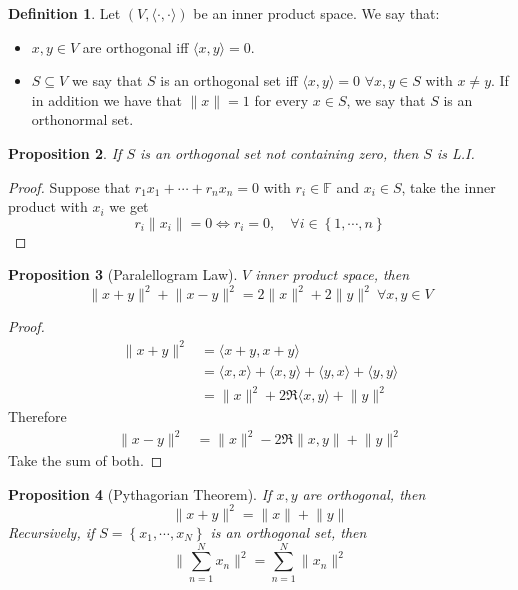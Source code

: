 \documentclass[11pt,a4paper]{article}
\theoremstyle{definition}
\newtheorem{definition}{Definition}[section]
\theoremstyle{plain}
\newtheorem{proposition}[definition]{Proposition}
\theoremstyle{remark}
\newcommand{\F}{\mathbb{F}}
\renewcommand{\set}[1]{\left\{ #1 \right\}}
\newcommand{\angles}[1]{\langle #1 \rangle}
\newcommand{\norm}[1]{\lVert #1 \rVert}
\newcommand{\1}{\mathbbm{1}}
\begin{document}
\begin{definition}
    Let $(V, \angles{\cdot, \cdot})$ be an inner product space. We say that: 
    \begin{itemize}
        \item $x, y \in V$ are orthogonal iff $\angles{x, y} = 0$.
        \item $S \subseteq V$ we say that $S$ is an orthogonal set iff $\angles{x, y} = 0$ $\forall x, y \in S$ with $x \ne y$. If in addition we have that 
        $\norm{x} = 1$ for every $x \in S$, we say that $S$ is an orthonormal set. 
    \end{itemize}
\end{definition}

\begin{proposition}
    If $S$ is an orthogonal set not containing zero, then $S$ is L.I. 
\end{proposition}

\begin{proof}
    Suppose that $r_1 x_1 + \cdots + r_n x_n = 0$ with $r_i \in \F$ and $x_i \in S$, take the inner product with $x_i$ we get 
    $$r_i \norm{x_i} = 0 \iff r_i = 0, \quad \forall i \in \set{1, \cdots, n}$$
\end{proof}

\begin{proposition}[Paralellogram Law]
    $V$ inner product space, then 
    $$\norm{x + y}^2 + \norm{x-y}^2 = 2 \norm{x}^2 + 2 \norm{y}^2 \ \forall x,y \in V$$
\end{proposition}

\begin{proof}
    \begin{align*}
        \norm{x+y}^2 &= \angles{x+y, x+y} \\
        &= \angles{x,x} + \angles{x, y} + \angles{y,x} + \angles{y,y} \\
        &= \norm{x}^2 + 2 \Re \angles{x,y} + \norm{y}^2 
    \end{align*}
    Therefore 
    \begin{align*}
        \norm{x-y}^2 &= \norm{x}^2 - 2 \Re \norm{x,y} + \norm{y}^2
    \end{align*}
    Take the sum of both.
\end{proof}

\begin{proposition}[Pythagorian Theorem]
    If $x, y$ are orthogonal, then 
    $$\norm{x + y}^2 = \norm{x} + \norm{y}$$
    Recursively, if $S = \set{x_1, \cdots, x_N}$ is an orthogonal set, then 
    $$\norm{\sum_{n=1}^N x_n}^2 = \sum_{n=1}^N \norm{x_n}^2$$
\end{proposition}
\end{document}
